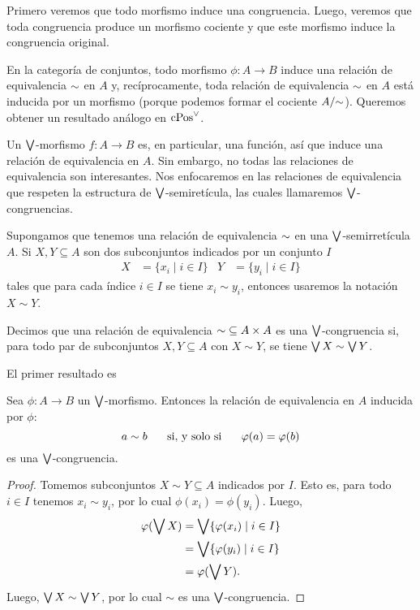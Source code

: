 Primero veremos que todo morfismo induce una congruencia.
Luego, veremos que toda congruencia produce un morfismo cociente y
que este morfismo induce la congruencia original.

En la categoría de conjuntos, todo morfismo $\phi:A\to B$
induce una relación de equivalencia ${\sim}$ en $A$  y,
recíprocamente, toda relación de equivalencia ${\sim}$ en $A$ está
inducida por un morfismo (porque podemos formar el cociente
$A/{\sim}$).
Queremos obtener un resultado análogo en $\mathrm{cPos}^\vee$.

Un $\bigvee$-morfismo $f:A\to B$ es, en particular,
una función, así que induce una relación de equivalencia en $A$.
Sin embargo, no todas las relaciones de equivalencia son
interesantes. Nos enfocaremos en las relaciones de equivalencia
que respeten la estructura de $\bigvee$-semiretícula, las cuales
llamaremos $\bigvee$-congruencias.

Supongamos que tenemos una relación de equivalencia
${\sim}$ en una $\bigvee$-semirre\-tícula $A$.
Si $X,Y\subseteq A$ son dos subconjuntos 
indicados por un conjunto $I$
\begin{align*}
    X &= \{x_i \mid i\in I\} &
    Y &= \{y_i \mid i\in I\}
\end{align*}
tales que para cada índice $i\in I$ se tiene $x_i\sim y_i$,
entonces usaremos la notación $X\sim Y$.

Decimos que una relación de equivalencia ${\sim}\subseteq A\times
A$ es una $\bigvee$-congruencia si, para todo par de subconjuntos
$X,Y\subseteq A$ con $X\sim Y$, se tiene $\bigvee X\sim \bigvee Y$.

El primer resultado es
\begin{lemma}
  Sea $\phi:A\to B$ un $\bigvee$-morfismo.
  Entonces la relación de equivalencia en $A$ inducida por
  $\phi$:
  \[
      a\sim b \hspace{5mm}\text{ si, y solo si }\hspace{5mm} \varphi(a) = \varphi(b)
  \]
  es una $\bigvee$-congruencia.
\end{lemma}
\begin{proof}
  Tomemos subconjuntos $X\sim Y\subseteq A$ indicados por $I$.
  Esto es, para todo $i\in I$ tenemos $x_i\sim y_i$,
  por lo cual $\phi(x_i)=\phi(y_i)$.
  Luego,
  \begin{align*}
      \varphi(\bigvee X)
      &= \bigvee\{\varphi(x_i)\mid i\in I\} \\
      &= \bigvee\{\varphi(y_i)\mid i\in I\} \\
      &= \varphi(\bigvee Y).
  \end{align*}
  Luego, $\bigvee X \sim \bigvee Y$, por lo cual $\sim$ es una
  $\bigvee$-congruencia.
\end{proof}

